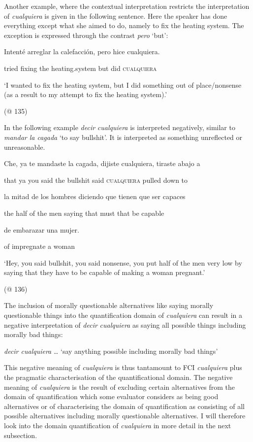 Another example, where the contextual interpretation restricts the interpretation of \textit{cualquiera} is given in the following sentence. Here the speaker has done everything except what she aimed to do, namely to fix the heating system. The exception is expressed through the contrast \textit{pero} ‘but’:

    Intenté  arreglar  la  calefacción,  pero  hice  cualquiera.

    tried  fixing  the  heating.system  but  did  \textsc{cualquiera}

    ‘I wanted to fix the heating system, but I did something out of place/nonsense (as a result to my attempt to fix the heating system).’

    (@ 135)

In the following example \textit{decir} \textit{cualquiera} is interpreted negatively, similar to \textit{mandar la cagada} ‘to say bullshit’. It is interpreted as something unreflected or unreasonable. 

    Che,  ya  te  mandaste  la  cagada,  dijiste  cualquiera,  tiraste  abajo  a

    that  ya  you  said  the  bullshit  said  \textsc{cualquiera}  pulled  down  to

    la  mitad  de  los  hombres  diciendo  que  tienen  que  ser  capaces

    the  half  of  the  men  saying  that  must  that  be  capable

    de  embarazar  una   mujer.

    of  impregnate  a  woman

    ‘Hey, you said bullshit, you said nonsense, you put half of the men very low by saying that they have to be capable of making a woman pregnant.’

    (@ 136)

The inclusion of morally questionable alternatives like saying morally questionable things into the quantification domain of \textit{cualquiera} can result in a negative interpretation of \textit{decir} \textit{cualquiera} as saying all possible things including morally bad things:

    \textit{decir cualquiera} … ‘say anything possible including morally bad things’

This negative meaning of \textit{cualquiera} is thus tantamount to FCI \textit{cualquiera} plus the pragmatic characterisation of the quantificational domain. The negative meaning of \textit{cualquiera} is the result of excluding certain alternatives from the domain of quantification which some evaluator considers as being good alternatives or of characterising the domain of quantification as consisting of all possible alternatives including morally questionable alternatives. I will therefore look into the domain quantification of \textit{cualquiera} in more detail in the next subsection. 


